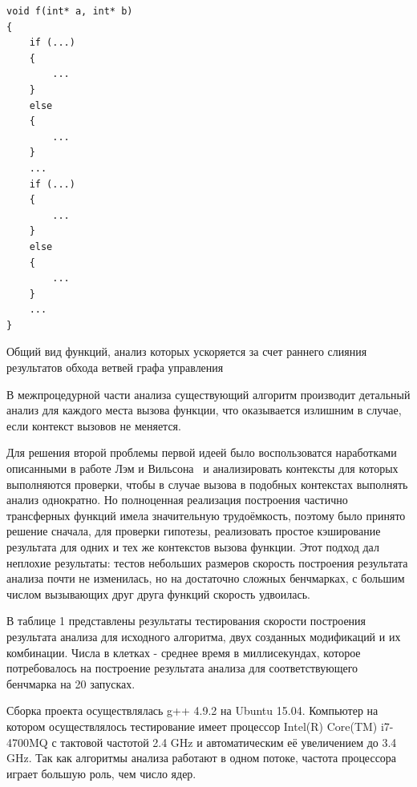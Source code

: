 \begin{ListingEnv}[H]
\begin{lstlisting}
void f(int* a, int* b)
{
    if (...)
    {
        ...
    }
    else
    {
        ...
    }
    ...
    if (...)
    {
        ...
    }
    else
    {
        ...
    }
    ...
}
\end{lstlisting}
\caption{Общий вид функций, анализ которых ускоряется за счет раннего слияния результатов обхода ветвей графа управления}
\label{list:otherlevels}
\end{ListingEnv}

В межпроцедурной части анализа существующий алгоритм производит детальный анализ для каждого места вызова функции, что оказывается излишним в случае, если контекст вызовов не меняется.

Для решения второй проблемы первой идеей было воспользоватся наработками описанными в работе Лэм и Вильсона~\autocite{WilsonLamSIGPLAN95} и анализировать контексты для которых выполняются проверки, чтобы в случае вызова в подобных контекстах выполнять анализ однократно. Но полноценная реализация построения частично трансферных функций имела значительную трудоёмкость, поэтому было принято решение сначала, для проверки гипотезы, реализовать простое кэширование результата для одних и тех же контекстов вызова функции. Этот подход дал неплохие результаты: тестов небольших размеров скорость построения результата анализа почти не изменилась, но на достаточно сложных бенчмарках, с большим числом вызывающих друг друга функций скорость удвоилась.

\Conc

В таблице 1 представлены результаты тестирования скорости построения результата анализа для исходного алгоритма, двух созданных модификаций и их комбинации. Числа в клетках - среднее время в миллисекундах, которое потребовалось на построение результата анализа для соответствующего бенчмарка на 20 запусках.

Сборка проекта осуществлялась g++ 4.9.2 на Ubuntu 15.04. Компьютер на котором осуществлялось тестирование имеет процессор Intel(R) Core(TM) i7-4700MQ с тактовой частотой 2.4 GHz и автоматическим её увеличением до 3.4 GHz. Так как алгоритмы анализа работают в одном потоке, частота процессора играет большую роль, чем число ядер.

